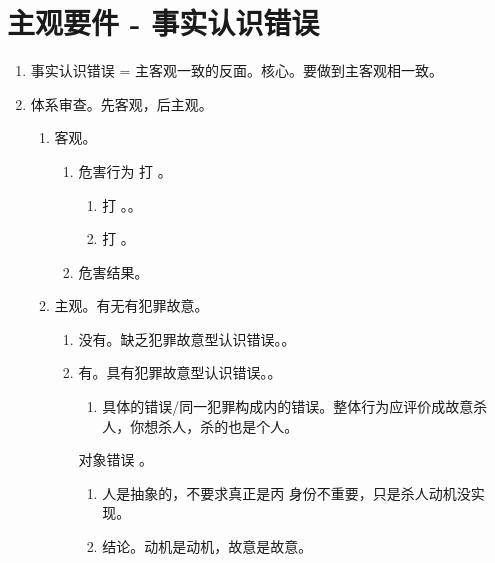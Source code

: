 \section{主观要件 - 事实认识错误}
\begin{enumerate}
  \item 事实认识错误 = 主客观一致的反面。核心。要做到主客观相一致。
  \item 体系审查。先客观，后主观。
        \begin{enumerate}
          \item 客观。
                \begin{enumerate}
                  \item 危害行为 \dui 打 \cuo。
                        \begin{enumerate}
                          \item 打 \cuo。。
                          \item 打 \dui \xjt。
                        \end{enumerate}
                  \item 危害结果。
                \end{enumerate}
          \item 主观。有无有犯罪故意。
                \begin{enumerate}
                  \item 没有。缺乏犯罪故意型认识错误。。
                  \item 有。具有犯罪故意型认识错误。。
                        \begin{enumerate}[series=l_after]
                          \item 具体的错误/同一犯罪构成内的错误。整体行为应评价成故意杀人，你想杀人，杀的也是个人。
                        \end{enumerate}

                        \begin{kk}{对象错误}
                          。
                          \begin{enumerate}
                            \item 人是抽象的，不要求真正是丙 \yjt 身份不重要，只是杀人动机没实现。
                            \item 结论。动机是动机，故意是故意。
                          \end{enumerate}
                        \end{kk}


\end{enumerate}
\end{enumerate}
\end{enumerate}
